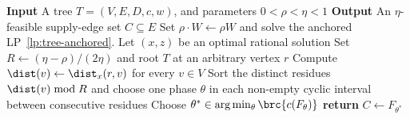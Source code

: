 \begin{algorithm}[tbp]
    \caption{Anchored-LP rounding on a supply tree}
    \textbf{Input} A tree $T=(V,E,D,c,w)$, and parameters $0<\rho<\eta<1$\;
    \textbf{Output} An $\eta$-feasible supply-edge set $C\subseteq E$\;
    Set $\rho\cdot W\gets\rho W$ and solve the anchored LP~\eqref{lp:tree-anchored}. Let $(x,z)$ be an optimal rational solution\;
    Set $R\gets(\eta-\rho)/(2\eta)$ and root $T$ at an arbitrary vertex $r$\;
    Compute $\dist(v)\gets \dist_x(r,v)$ for every $v\in V$\;
    Sort the distinct residues $\dist(v)\bmod R$ and choose one phase $\theta$ in each non-empty cyclic interval between consecutive residues\;
    Choose $\theta^*\in\arg\min_{\theta}\brc{c(F_\theta)}$\;
    \textbf{return} $C\gets F_{\theta^*}$\;
\end{algorithm}
